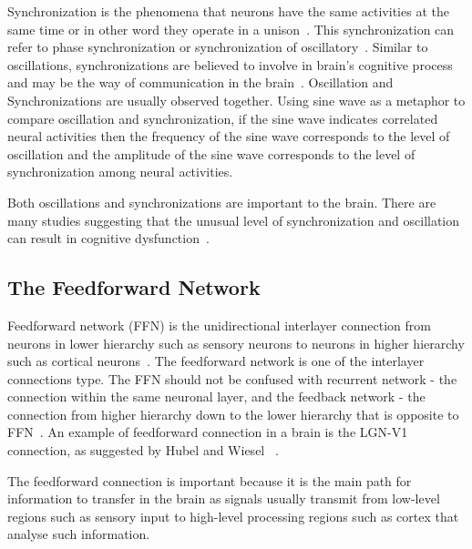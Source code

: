 Synchronization is the phenomena that neurons have the same activities at the same time or in other word they operate in a unison~\cite{ward2003synchronous}. This synchronization can refer to phase synchronization or synchronization of oscillatory~\cite{varela2001brainweb, gray1996chattering, salinas2001correlated}. Similar to oscillations, synchronizations are believed to involve in brain's cognitive process and may be the way of communication in the brain~\cite{ward2003synchronous, fries2001modulation, engel2001dynamic, womelsdorf2007modulation}. Oscillation and Synchronizations are usually observed together. Using sine wave as a metaphor to compare oscillation and synchronization, if the sine wave indicates correlated neural activities then the frequency of the sine wave corresponds to the level of oscillation and the amplitude of the sine wave corresponds to the level of synchronization among neural activities.

Both oscillations and synchronizations are important to the brain. There are many studies suggesting that the unusual level of synchronization and oscillation can result in cognitive dysfunction~\cite{uhlhaas2010abnormal, grice2001disordered, hammond2007pathological,dinstein2011disrupted, uhlhaas2006neural, schnitzler2005normal, bacsar2008review}.



\subsection{The Feedforward Network}

Feedforward network (FFN) is the unidirectional interlayer connection from neurons in lower hierarchy such as sensory neurons to neurons in higher hierarchy such as cortical neurons~\cite{felleman1991distributed, kumar2010spiking}.
The feedforward network is one of the interlayer connections type. The FFN should not be confused with recurrent network - the connection within the same neuronal layer, and the feedback network - the connection from higher hierarchy down to the lower hierarchy that is opposite to FFN~\cite{carnevale2006neuron, Bower2003Genesis, Kandel5thEdition}. 
An example of feedforward connection in a brain is the LGN-V1 connection, as suggested by Hubel and Wiesel ~\cite{hubel1962receptive}.

The feedforward connection is important because it is the main path for information to transfer in the brain as signals usually transmit from low-level regions such as sensory input to high-level processing regions such as cortex that analyse such information. 

